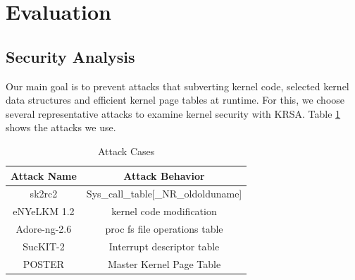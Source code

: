\documentclass[conference]{IEEEtran}
\begin{document}
\section{Evaluation} \label{sec:eva}

\subsection{Security Analysis} \label{sec:seceva}
Our main goal is to prevent attacks that subverting kernel code, selected kernel data structures and efficient kernel page tables at runtime. For this, we choose several representative attacks to examine kernel security with KRSA. Table \ref{table:attacks} shows the attacks we use. 

\begin{scriptsize}
\begin{table}[h!]
  \centering
  \caption{Attack Cases}
  \begin{tabular}{c|c}
    \hline
    \textbf{Attack Name    } & \textbf{Attack Behavior} \\
    \hline
      sk2rc2  & Sys\_call\_table[\_NR\_oldolduname] \\
    \hdashline[.4pt/1pt]
      eNYeLKM 1.2 & kernel code modification \\
    \hdashline[.4pt/1pt]
      Adore-ng-2.6  & proc fs file operations table \\
    \hdashline[.4pt/1pt]
      SucKIT-2 & Interrupt descriptor table \\
    \hdashline[.4pt/1pt]
      POSTER & Master Kernel Page Table \\
    \hline
    \end{tabular}
  \label{table:attacks}
\end{table}
\end{scriptsize}
\end{document}

